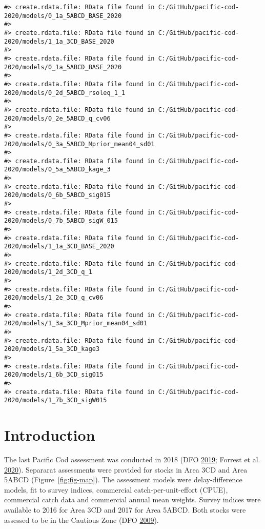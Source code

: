 \documentclass[11pt]{book}
\begin{document}
\frontmatter
\begin{verbatim}
#> create.rdata.file: RData file found in C:/GitHub/pacific-cod-2020/models/0_1a_5ABCD_BASE_2020
#> 
#> create.rdata.file: RData file found in C:/GitHub/pacific-cod-2020/models/1_1a_3CD_BASE_2020
#> 
#> create.rdata.file: RData file found in C:/GitHub/pacific-cod-2020/models/0_1a_5ABCD_BASE_2020
#> 
#> create.rdata.file: RData file found in C:/GitHub/pacific-cod-2020/models/0_2d_5ABCD_rsoleq_1_1
#> 
#> create.rdata.file: RData file found in C:/GitHub/pacific-cod-2020/models/0_2e_5ABCD_q_cv06
#> 
#> create.rdata.file: RData file found in C:/GitHub/pacific-cod-2020/models/0_3a_5ABCD_Mprior_mean04_sd01
#> 
#> create.rdata.file: RData file found in C:/GitHub/pacific-cod-2020/models/0_5a_5ABCD_kage_3
#> 
#> create.rdata.file: RData file found in C:/GitHub/pacific-cod-2020/models/0_6b_5ABCD_sig015
#> 
#> create.rdata.file: RData file found in C:/GitHub/pacific-cod-2020/models/0_7b_5ABCD_sigW_015
#> 
#> create.rdata.file: RData file found in C:/GitHub/pacific-cod-2020/models/1_1a_3CD_BASE_2020
#> 
#> create.rdata.file: RData file found in C:/GitHub/pacific-cod-2020/models/1_2d_3CD_q_1
#> 
#> create.rdata.file: RData file found in C:/GitHub/pacific-cod-2020/models/1_2e_3CD_q_cv06
#> 
#> create.rdata.file: RData file found in C:/GitHub/pacific-cod-2020/models/1_3a_3CD_Mprior_mean04_sd01
#> 
#> create.rdata.file: RData file found in C:/GitHub/pacific-cod-2020/models/1_5a_3CD_kage3
#> 
#> create.rdata.file: RData file found in C:/GitHub/pacific-cod-2020/models/1_6b_3CD_sig015
#> 
#> create.rdata.file: RData file found in C:/GitHub/pacific-cod-2020/models/1_7b_3CD_sigW015
\end{verbatim}
\clearpage

\hypertarget{introduction}{%
\section{Introduction}\label{introduction}}

The last Pacific Cod assessment was conducted in 2018 (DFO \protect\hyperlink{ref-dfo2019}{2019}; Forrest et al. \protect\hyperlink{ref-forrest2020}{2020}). Separarat assessments were provided for stocks in Area 3CD and Area 5ABCD (Figure~\ref{fig:fig-map}). The assessment models were delay-difference models, fit to survey indices, commercial catch-per-unit-effort (CPUE), commercial catch data and commercial annual mean weights. Survey indices were available to 2016 for Area 3CD and 2017 for Area 5ABCD. Both stocks were assessed to be in the Cautious Zone (DFO \protect\hyperlink{ref-dfo2009}{2009}).
\end{document}

